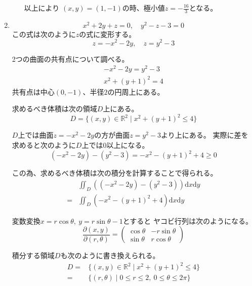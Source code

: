 \documentclass[12pt,b5paper]{ltjsarticle}
\begin{document}
\begin{enumerate}
\begin{enumerate}
以上により
$(x,y)=(1,-1)$の時、極小値$z=-\frac{16}{3}$となる。
\end{enumerate}


 \item
      \begin{equation}
       x^2+2y+z=0, \quad y^2-z-3=0
      \end{equation}
      この式は次のように$z$の式に変形する。
      \begin{equation}
       z=-x^2-2y, \quad z=y^2-3
      \end{equation}

      2つの曲面の共有点について調べる。
      \begin{gather}
       -x^2-2y = y^2-3\\
       x^2 + (y +1)^2 = 4
      \end{gather}
      共有点は中心$(0,-1)$、半径$2$の円周上にある。

      求めるべき体積は次の領域$D$上にある。
      \begin{equation}
       D= \{ (x,y)\in\mathbb{R}^2 \mid x^2 + (y +1)^2 \leq 4 \}
      \end{equation}

      $D$上では曲面$z=-x^2-2y$の方が曲面$z=y^2-3$より上にある。
      実際に差を求めると次のように$D$上では0以上になる。
      \begin{equation}
       (-x^2-2y)-(y^2-3) = -x^2 -(y+1)^2 +4 \geq0
      \end{equation}

      この為、求めるべき体積は次の積分を計算することで得られる。
      \begin{align}
       & \iint_{D} ((-x^2-2y)-(y^2-3))\mathrm{d}x\mathrm{d}y\\
       =& \iint_{D} (-x^2-(y+1)^2+4)\mathrm{d}x\mathrm{d}y
      \end{align}

      変数変換$x=r\cos\theta, \ y=r\sin\theta-1$とすると
      ヤコビ行列は次のようになる。
      \begin{equation}
       \frac{\partial (x,y)}{\partial (r,\theta)} =
        \begin{pmatrix}
         \cos\theta & -r\sin\theta\\
         \sin\theta & r\cos\theta
        \end{pmatrix}
      \end{equation}

      積分する領域$D$も次のように書き換えられる。
      \begin{align}
       D=& \{ (x,y)\in\mathbb{R}^2 \mid x^2 + (y +1)^2 \leq 4 \}\\
       =& \{ (r,\theta) \mid 0 \leq r \leq 2 ,\ 0\leq \theta \leq 2\pi \}
      \end{align}


\end{enumerate}
\end{document}
